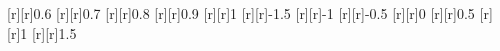\begin{psfrags}
[r][r]{0.6}%
[r][r]{0.7}%
[r][r]{0.8}%
[r][r]{0.9}%
[r][r]{1}%
[r][r]{-1.5}%
[r][r]{-1}%
[r][r]{-0.5}%
[r][r]{0}%
[r][r]{0.5}%
[r][r]{1}%
[r][r]{1.5}%
%
%
\end{psfrags}%
%
